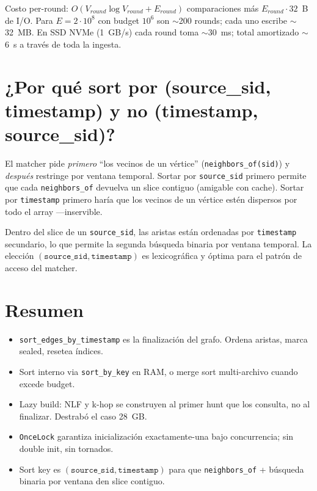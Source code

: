 \noindent
Costo per-round: $O(V_{round} \log V_{round} + E_{round})$
comparaciones más $E_{round} \cdot 32$~B de I/O. Para
$E = 2 \cdot 10^8$ con budget $10^6$ son $\sim$200 rounds; cada uno
escribe $\sim$32~MB. En SSD NVMe (1~GB/s) cada round toma
$\sim$30~ms; total amortizado $\sim$6~s a través de toda la
ingesta.

\section{¿Por qué sort por (source\_sid, timestamp) y no
(timestamp, source\_sid)?}

El matcher pide \emph{primero} ``los vecinos de un vértice''
(\texttt{neighbors\_of(sid)}) y \emph{después} restringe por
ventana temporal. Sortar por \texttt{source\_sid} primero permite
que cada \texttt{neighbors\_of} devuelva un slice contiguo
(amigable con cache). Sortar por \texttt{timestamp} primero haría
que los vecinos de un vértice estén dispersos por todo el array
---inservible.

\begin{nota}
Dentro del slice de un \texttt{source\_sid}, las aristas están
ordenadas por \texttt{timestamp} secundario, lo que permite la
segunda búsqueda binaria por ventana temporal. La elección
\((\texttt{source\_sid}, \texttt{timestamp})\) es lexicográfica y
óptima para el patrón de acceso del matcher.
\end{nota}

\section{Resumen}

\begin{itemize}
    \item \texttt{sort\_edges\_by\_timestamp} es la finalización del
    grafo. Ordena aristas, marca sealed, resetea índices.
    \item Sort interno via \texttt{sort\_by\_key} en RAM, o merge
    sort multi-archivo cuando excede budget.
    \item Lazy build: NLF y k-hop se construyen al primer hunt que
    los consulta, no al finalizar. Destrabó el caso 28~GB.
    \item \texttt{OnceLock} garantiza inicialización exactamente-una
    bajo concurrencia; sin double init, sin tornados.
    \item Sort key es \((\texttt{source\_sid}, \texttt{timestamp})\)
    para que \texttt{neighbors\_of} + búsqueda binaria por ventana
    den slice contiguo.
\end{itemize}

